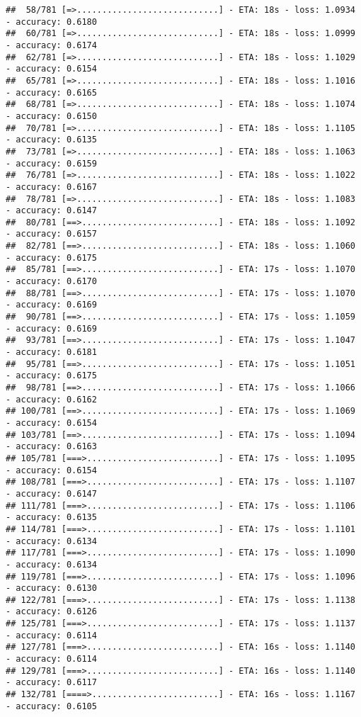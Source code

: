 \documentclass[
]{article}
\begin{document}
\begin{verbatim}
##  58/781 [=>............................] - ETA: 18s - loss: 1.0934 - accuracy: 0.6180
##  60/781 [=>............................] - ETA: 18s - loss: 1.0999 - accuracy: 0.6174
##  62/781 [=>............................] - ETA: 18s - loss: 1.1029 - accuracy: 0.6154
##  65/781 [=>............................] - ETA: 18s - loss: 1.1016 - accuracy: 0.6165
##  68/781 [=>............................] - ETA: 18s - loss: 1.1074 - accuracy: 0.6150
##  70/781 [=>............................] - ETA: 18s - loss: 1.1105 - accuracy: 0.6135
##  73/781 [=>............................] - ETA: 18s - loss: 1.1063 - accuracy: 0.6159
##  76/781 [=>............................] - ETA: 18s - loss: 1.1022 - accuracy: 0.6167
##  78/781 [=>............................] - ETA: 18s - loss: 1.1083 - accuracy: 0.6147
##  80/781 [==>...........................] - ETA: 18s - loss: 1.1092 - accuracy: 0.6157
##  82/781 [==>...........................] - ETA: 18s - loss: 1.1060 - accuracy: 0.6175
##  85/781 [==>...........................] - ETA: 17s - loss: 1.1070 - accuracy: 0.6170
##  88/781 [==>...........................] - ETA: 17s - loss: 1.1070 - accuracy: 0.6169
##  90/781 [==>...........................] - ETA: 17s - loss: 1.1059 - accuracy: 0.6169
##  93/781 [==>...........................] - ETA: 17s - loss: 1.1047 - accuracy: 0.6181
##  95/781 [==>...........................] - ETA: 17s - loss: 1.1051 - accuracy: 0.6175
##  98/781 [==>...........................] - ETA: 17s - loss: 1.1066 - accuracy: 0.6162
## 100/781 [==>...........................] - ETA: 17s - loss: 1.1069 - accuracy: 0.6154
## 103/781 [==>...........................] - ETA: 17s - loss: 1.1094 - accuracy: 0.6163
## 105/781 [===>..........................] - ETA: 17s - loss: 1.1095 - accuracy: 0.6154
## 108/781 [===>..........................] - ETA: 17s - loss: 1.1107 - accuracy: 0.6147
## 111/781 [===>..........................] - ETA: 17s - loss: 1.1106 - accuracy: 0.6135
## 114/781 [===>..........................] - ETA: 17s - loss: 1.1101 - accuracy: 0.6134
## 117/781 [===>..........................] - ETA: 17s - loss: 1.1090 - accuracy: 0.6134
## 119/781 [===>..........................] - ETA: 17s - loss: 1.1096 - accuracy: 0.6130
## 122/781 [===>..........................] - ETA: 17s - loss: 1.1138 - accuracy: 0.6126
## 125/781 [===>..........................] - ETA: 17s - loss: 1.1137 - accuracy: 0.6114
## 127/781 [===>..........................] - ETA: 16s - loss: 1.1140 - accuracy: 0.6114
## 129/781 [===>..........................] - ETA: 16s - loss: 1.1140 - accuracy: 0.6117
## 132/781 [====>.........................] - ETA: 16s - loss: 1.1167 - accuracy: 0.6105

\end{verbatim}
\end{document}
